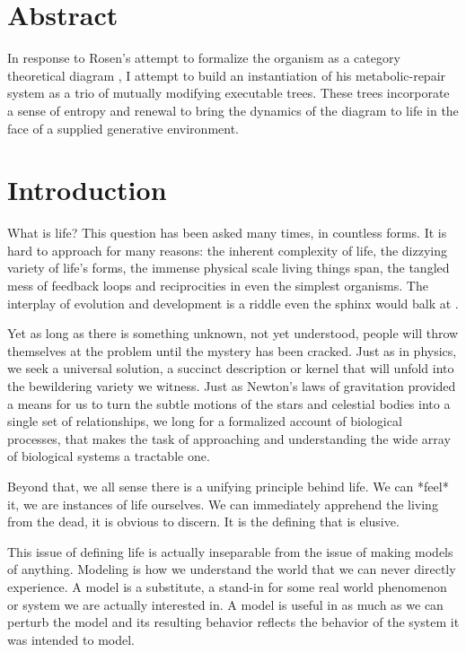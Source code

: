 \documentclass[12pt]{article}
\begin{document}
\maketitle

\section{Abstract}

In response to Rosen's attempt to formalize the organism as a category theoretical diagram \cite{Rosen}, I attempt to build an instantiation of his metabolic-repair system as a trio of mutually modifying executable trees.  These trees incorporate a sense of entropy and renewal to bring the dynamics of the diagram to life in the face of a supplied generative environment.

\section{Introduction}

What is life?  This question has been asked many times, in countless forms.  It is hard to approach for many reasons: the inherent complexity of life, the dizzying variety of life's forms, the immense physical scale living things span, the tangled mess of feedback loops and reciprocities in even the simplest organisms.  The interplay of evolution and development is a riddle even the sphinx would balk at \cite{Oyama}.  

Yet as long as there is something unknown, not yet understood, people will throw themselves at the problem until the mystery has been cracked.  Just as in physics, we seek a universal solution, a succinct description or kernel that will unfold into the bewildering variety we witness.  Just as Newton's laws of gravitation provided a means for us to turn the subtle motions of the stars and celestial bodies into a single set of relationships, we long for a formalized account of biological processes, that makes the task of approaching and understanding the wide array of biological systems a tractable one.  

Beyond that, we all sense there is a unifying principle behind life.  We can *feel* it, we are instances of life ourselves.  We can immediately apprehend the living from the dead, it is obvious to discern.  It is the defining that is elusive.  

This issue of defining life is actually inseparable from the issue of making models of anything.  Modeling is how we understand the world that we can never directly experience.  A model is a substitute, a stand-in for some real world phenomenon or system we are actually interested in.  A model is useful in as much as we can perturb the model and its resulting behavior reflects the behavior of the system it was intended to model.  
\end{document}
